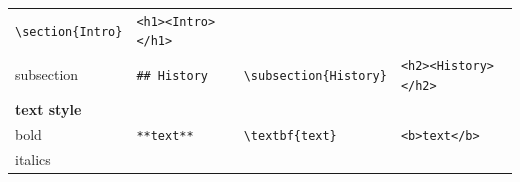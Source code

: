 \documentclass[10pt,fleqn]{wlpeerj}
\begin{document}
\begin{longtable}[c]{@{}llll@{}}
\begin{minipage}[t]{0.33\columnwidth}
\texttt{\textbackslash{}section\{Intro\}}
\strut\end{minipage} &
\begin{minipage}[t]{0.27\columnwidth}\raggedright\strut
\texttt{\textless{}h1\textgreater{}\textless{}Intro\textgreater{}\textless{}/h1\textgreater{}}
\strut\end{minipage}\tabularnewline
\begin{minipage}[t]{0.11\columnwidth}\raggedright\strut
subsection
\strut\end{minipage} &
\begin{minipage}[t]{0.17\columnwidth}\raggedright\strut
\texttt{\#\#\ History}
\strut\end{minipage} &
\begin{minipage}[t]{0.33\columnwidth}\raggedright\strut
\texttt{\textbackslash{}subsection\{History\}}
\strut\end{minipage} &
\begin{minipage}[t]{0.27\columnwidth}\raggedright\strut
\texttt{\textless{}h2\textgreater{}\textless{}History\textgreater{}\textless{}/h2\textgreater{}}
\strut\end{minipage}\tabularnewline
\begin{minipage}[t]{0.11\columnwidth}\raggedright\strut
\textbf{text style}
\strut\end{minipage} &
\begin{minipage}[t]{0.17\columnwidth}\raggedright\strut
\strut\end{minipage} &
\begin{minipage}[t]{0.33\columnwidth}\raggedright\strut
\strut\end{minipage}\tabularnewline
\begin{minipage}[t]{0.11\columnwidth}\raggedright\strut
bold
\strut\end{minipage} &
\begin{minipage}[t]{0.17\columnwidth}\raggedright\strut
\texttt{**text**}
\strut\end{minipage} &
\begin{minipage}[t]{0.33\columnwidth}\raggedright\strut
\texttt{\textbackslash{}textbf\{text\}}
\strut\end{minipage} &
\begin{minipage}[t]{0.27\columnwidth}\raggedright\strut
\texttt{\textless{}b\textgreater{}text\textless{}/b\textgreater{}}
\strut\end{minipage}\tabularnewline
\begin{minipage}[t]{0.11\columnwidth}\raggedright\strut
italics
\strut\end{minipage} &

\end{longtable}
\end{document}

